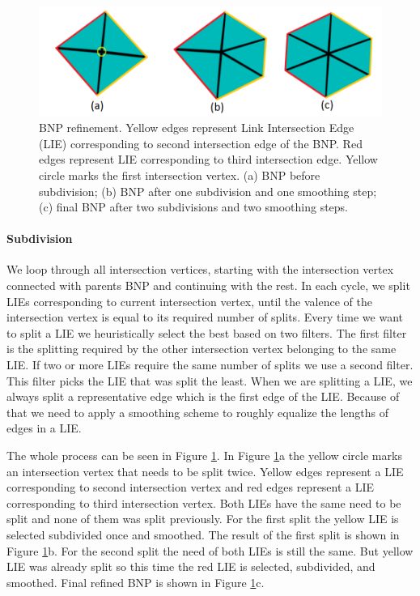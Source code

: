 \begin{figure}[h]
    \centering
    \includegraphics[width=\textwidth]{images/refinement_ilu.png}
    \caption[BNP refinement]{BNP refinement. Yellow edges represent Link Intersection Edge (LIE) corresponding to second intersection edge of the BNP. Red edges represent LIE corresponding to third intersection edge. Yellow circle marks the first intersection vertex. (a) BNP before subdivision; (b) BNP after one subdivision and one smoothing step; (c) final BNP after two subdivisions and two smoothing steps.}
    \label{fig:refinement_ilu}
\end{figure}

\paragraph{Subdivision}
We loop through all intersection vertices, starting with the intersection vertex connected with parents BNP and continuing with the rest. In each cycle, we split LIEs corresponding to current intersection vertex, until the valence of the intersection vertex is equal to its required number of splits. Every time we want to split a LIE we heuristically select the best based on two filters. The first filter is the splitting required by the other intersection vertex belonging to the same LIE. If two or more LIEs require the same number of splits we use a second filter. This filter picks the LIE that was split the least. When we are splitting a LIE, we always split a representative edge which is the first edge of the LIE. Because of that we need to apply a smoothing scheme to roughly equalize the lengths of edges in a LIE. 

The whole process can be seen in Figure \ref{fig:refinement_ilu}. In Figure \ref{fig:refinement_ilu}a the yellow circle marks an intersection vertex that needs to be split twice. Yellow edges represent a LIE corresponding to second intersection vertex and red edges represent a LIE corresponding to third intersection vertex. Both LIEs have the same need to be split and none of them was split previously. For the first split the yellow LIE is selected subdivided once and smoothed. The result of the first split is shown in Figure \ref{fig:refinement_ilu}b. For the second split the need of both LIEs is still the same. But yellow LIE was already split so this time the red LIE is selected, subdivided, and smoothed. Final refined BNP is shown in Figure \ref{fig:refinement_ilu}c.

